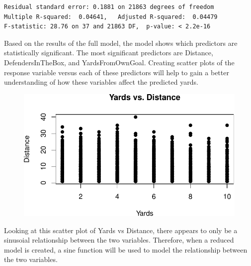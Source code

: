 \documentclass[
  super,
  preprint,
  3p]{elsarticle}
\newenvironment{Shaded}{\begin{snugshade}}{\end{snugshade}}
\newcommand{\AttributeTok}[1]{\textcolor[rgb]{0.40,0.45,0.13}{#1}}
\newcommand{\CommentTok}[1]{\textcolor[rgb]{0.37,0.37,0.37}{#1}}
\newcommand{\DecValTok}[1]{\textcolor[rgb]{0.68,0.00,0.00}{#1}}
\newcommand{\FunctionTok}[1]{\textcolor[rgb]{0.28,0.35,0.67}{#1}}
\newcommand{\NormalTok}[1]{\textcolor[rgb]{0.00,0.23,0.31}{#1}}
\newcommand{\SpecialCharTok}[1]{\textcolor[rgb]{0.37,0.37,0.37}{#1}}
\newcommand{\StringTok}[1]{\textcolor[rgb]{0.13,0.47,0.30}{#1}}
\begin{document}
\begin{verbatim}
Residual standard error: 0.1881 on 21863 degrees of freedom
Multiple R-squared:  0.04641,   Adjusted R-squared:  0.04479 
F-statistic: 28.76 on 37 and 21863 DF,  p-value: < 2.2e-16
\end{verbatim}

Based on the results of the full model, the model shows which predictors
are statistically significant. The most significant predictors are
Distance, DefendersInTheBox, and YardsFromOwnGoal. Creating scatter
plots of the response variable versus each of these predictors will help
to gain a better understanding of how these variables affect the
predicted yards.

\begin{Shaded}
\end{Shaded}

\begin{figure}[H]

{\centering \includegraphics{project_report_files/figure-pdf/unnamed-chunk-26-1.pdf}

}

\end{figure}

Looking at this scatter plot of Yards vs Distance, there appears to only
be a sinusoial relationship between the two variables. Therefore, when a
reduced model is created, a sine function will be used to model the
relationship between the two variables.
\end{document}
